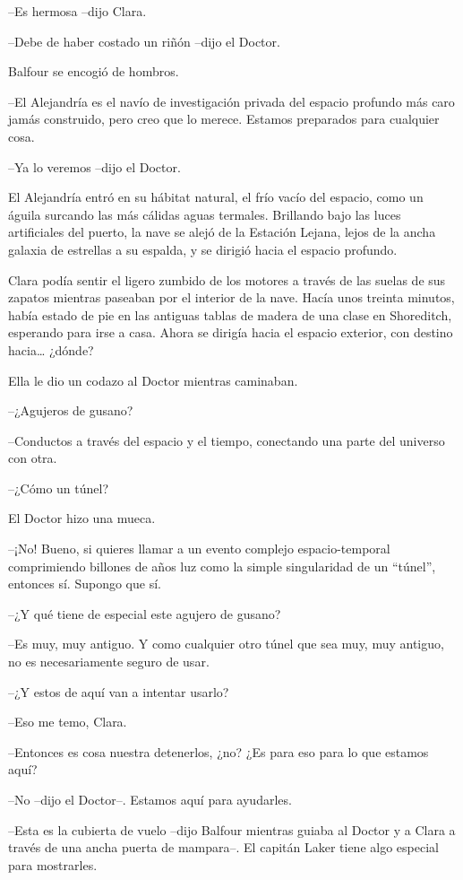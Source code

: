 {--Es hermosa --dijo Clara.}

{--Debe de haber costado un riñón --dijo el Doctor.}

{Balfour se encogió de hombros.}

{--El Alejandría es el navío de investigación privada del espacio
 profundo más caro jamás construido, pero creo que lo merece. Estamos
preparados para cualquier cosa.}

{--Ya lo veremos --dijo el Doctor.}

{El Alejandría entró
 en su hábitat natural, el frío vacío del espacio, como un águila
 surcando las más cálidas aguas termales. Brillando bajo las luces
 artificiales del puerto, la nave se alejó de la Estación Lejana, lejos
 de la ancha galaxia de estrellas a su espalda, y se dirigió hacia el
espacio profundo.}

{Clara podía sentir el ligero zumbido de los motores a través de las
 suelas de sus zapatos mientras paseaban por el interior de la nave.
 Hacía unos treinta minutos, había estado de pie en las antiguas tablas
 de madera de una clase en Shoreditch, esperando para irse a casa. Ahora
 se dirigía hacia el espacio exterior, con destino hacia\ldots{}
¿dónde?}

{Ella le dio un codazo al Doctor mientras caminaban.}

{--¿Agujeros de gusano?}

{--Conductos a través del espacio y el tiempo, conectando una parte del
universo con otra.}

{--¿Cómo un túnel?}

{El Doctor hizo una mueca.}

{--¡No! Bueno, si quieres llamar a un evento complejo espacio-temporal
 comprimiendo billones de años luz como la simple singularidad de un
``túnel'', entonces sí. Supongo que sí.}

{--¿Y qué tiene de especial este agujero de gusano?}

{--Es muy, muy antiguo. Y como cualquier otro túnel que sea muy, muy
antiguo, no es necesariamente seguro de usar.}

{--¿Y estos de aquí van a intentar usarlo?}

{--Eso me temo, Clara.}

{--Entonces es cosa nuestra detenerlos, ¿no? ¿Es para eso para lo que
estamos aquí?}

{--No --dijo el Doctor--. Estamos aquí para ayudarles.}

{--Esta es la cubierta de vuelo --dijo
 Balfour mientras guiaba al Doctor y a Clara a través de una ancha puerta
de mampara--. El capitán Laker tiene algo especial para mostrarles.}

